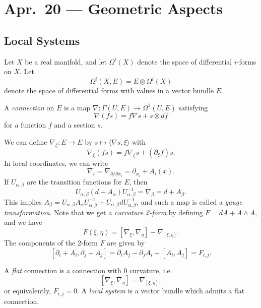 \chapter{Apr.~20 --- Geometric Aspects}

\section{Local Systems}

\begin{remark}
  Let $X$ be a real manifold, and
  let $\Omega^i(X)$ denote the space of
  differential $i$-forms on $X$.
  Let
  \[
    \Omega^i(X, E)
    = E \otimes \Omega^i(X)
  \]
  denote the space of differential
  forms with values in a vector bundle $E$.
\end{remark}

\begin{definition}
  A \emph{connection} on $E$ is a map
  $\nabla : \Gamma(U, E) \to \Omega^1(U, E)$
  satisfying
  \[
    \nabla(fs) = f \nabla s + s \otimes df
  \]
  for a function $f$ and a section $s$.
\end{definition}

\begin{remark}
  We can define
  $\nabla_\xi : E \to E$
  by $s \mapsto \langle \nabla s, \xi \rangle$
  with
  \[
    \nabla_\xi(fs)
    = f \nabla_\xi s + (\partial_\xi f) s.
  \]
  In local coordinates, we can write
  \[
    \nabla_i
    = \nabla_{\partial / \partial x_i}
    = \partial_{x_i} + A_i(x).
  \]
  If $U_{\alpha, \beta}$ are the transition
  functions for $E$, then
  \[
    U_{\alpha, \beta}
    (d + A_\alpha) U_{\alpha, \beta}^{-1}
    = \nabla_\beta = d + A_\beta.
  \]
  This implies
  $A_\beta = U_{\alpha, \beta} A_\alpha U_{\alpha, \beta}^{-1} + U_{\alpha, \beta} d U_{\alpha, \beta}^{-1}$,
  and such a map is
  called a \emph{gauge transformation}.
  Note that we get a \emph{curvature 2-form}
  by defining $F = dA + A \wedge A$,
  and we have
  \[
    F(\xi, \eta)
    = [\nabla_{\xi}, \nabla_\eta] - \nabla_{[\xi, \eta]}.
  \]
  The components of the 2-form $F$
  are given by
  \[
    [\partial_i + A_i, \partial_j + A_j]
    = \partial_i A_j - \partial_j A_i + [A_i, A_j]
    = F_{i, j}.
  \]
\end{remark}

\begin{definition}
  A \emph{flat} connection is a connection
  with $0$ curvature, i.e.
  \[
    [\nabla_\xi, \nabla_\eta] = \nabla_{[\xi, \eta]},
  \]
  or equivalently, $F_{i, j} = 0$.
  A \emph{local system} is a vector bundle
  which admits a flat connection.
\end{definition}

